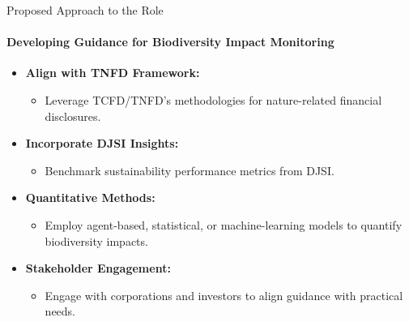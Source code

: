 \documentclass{beamer}
\begin{document}
\begin{frame}{Proposed Approach to the Role}
\framesubtitle{Developing Guidance for Biodiversity Impact Monitoring}

\begin{itemize}
    
    \item \textbf{Align with TNFD Framework:}
    \begin{itemize}
        \item Leverage TCFD/TNFD’s methodologies for nature-related financial disclosures.
    \end{itemize}
    
    \item \textbf{Incorporate DJSI Insights:}
    \begin{itemize}
        \item Benchmark sustainability performance metrics from DJSI.
    \end{itemize}
    
    \item \textbf{Quantitative Methods:}
    \begin{itemize}
        \item Employ agent-based, statistical, or machine-learning models to quantify biodiversity impacts.
    \end{itemize}
    
    \item \textbf{Stakeholder Engagement:}
    \begin{itemize}
        \item Engage with corporations and investors to align guidance with practical needs.
    \end{itemize}
    
\end{itemize}

\end{frame}



\end{document}

